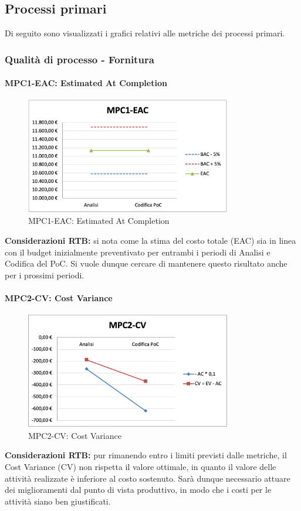 \subsection{Processi primari} \label{sec:processi_primari}
Di seguito sono visualizzati i grafici relativi alle metriche dei processi primari. 
\subsubsection{Qualità di processo - Fornitura}
\paragraph{MPC1-EAC: Estimated At Completion}
\begin{figure}[h!]
    \centering
    \includegraphics[width=0.8\textwidth]{images/MPC1-EAC.png}
    \caption{MPC1-EAC: Estimated At Completion}
\end{figure}
\noindent \textbf{Considerazioni RTB:} si nota come la stima del costo totale (EAC) sia in linea con il budget inizialmente preventivato per entrambi i periodi di Analisi e Codifica del PoC. Si vuole dunque cercare di mantenere questo risultato anche per i prossimi periodi.

\newpage
\paragraph{MPC2-CV: Cost Variance}
\begin{figure}[h!] 
    \centering
    \includegraphics[width=0.8\textwidth]{images/MPC2-CV.png}
    \caption{MPC2-CV: Cost Variance}
\end{figure}
\noindent \textbf{Considerazioni RTB:} pur rimanendo entro i limiti previsti dalle metriche, il Cost Variance (CV) non rispetta il valore ottimale, in quanto il valore delle attività realizzate è inferiore al costo sostenuto. Sarà dunque necessario attuare dei miglioramenti dal punto di vista produttivo, in modo che i costi per le attività siano ben giustificati.

